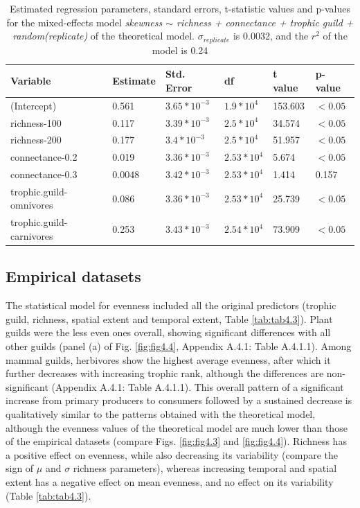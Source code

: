 \begin{landscape}
\begin{table}[ht!]
\centering
\caption[Coefficients from skewness regression in simulated networks]{\color{Gray}Estimated regression parameters, standard errors, t-statistic values and p-values for the mixed-effects model \textit{skewness $\sim$  richness + connectance + trophic guild + random(replicate)} of the theoretical model. $\sigma_{replicate}$ is 0.0032, and the $r^2$ of the model is 0.24}\label{tab:tab4.2}
\begin{tabular}{llllll}
\hline
Variable & Estimate & Std. Error &         df & t value & p-value \\
\hline
(Intercept)       & 0.561 &  $3.65*10^{-3}$ & $1.9*10^{4}$ & 153.603 & $<0.05$ \\
richness-100      & 0.117 &  $3.39*10^{-3}$ & $2.5*10^{4}$ & 34.574 & $<0.05$ \\
richness-200      & 0.177 &  $3.4*10^{-3}$ & $2.5*10^{4}$ &  51.957 & $<0.05$ \\
connectance-0.2   & 0.019 &  $3.36*10^{-3}$ & $2.53*10^{4}$ &   5.674 & $<0.05$ \\
connectance-0.3   & 0.0048 &  $3.42*10^{-3}$ & $2.53*10^{4}$ &   1.414  &  0.157  \\
trophic.guild-omnivores & 0.086 &  $3.36*10^{-3}$ & $2.53*10^{4}$ &  25.739  & $<0.05$ \\
trophic.guild-carnivores & 0.253 &  $3.43*10^{-3}$ & $2.54*10^{4}$ &  73.909  & $<0.05$ \\
\hline
\end{tabular}

\end{table}

\end{landscape}

\FloatBarrier

\subsection*{Empirical datasets}

The statistical model for evenness included all the original predictors (trophic guild, richness, spatial extent and temporal extent, Table \ref{tab:tab4.3}). Plant guilds were the less even ones overall, showing significant differences with all other guilds (panel (a) of Fig. \ref{fig:fig4.4}, Appendix A.4.1: Table A.4.1.1). Among mammal guilds, herbivores show the highest average evenness, after which it further decreases with increasing trophic rank, although the differences are non-significant (Appendix A.4.1: Table A.4.1.1). This overall pattern of a significant increase from primary producers to consumers followed by a sustained decrease is qualitatively similar to the patterns obtained with the theoretical model, although the evenness values of the theoretical model are much lower than those of the empirical datasets (compare Figs. \ref{fig:fig4.3} and \ref{fig:fig4.4}). Richness has a positive effect on evenness, while also decreasing its variability (compare the sign of $\mu$ and $\sigma$ richness parameters), whereas increasing temporal and spatial extent has a negative effect on mean evenness, and no effect on its variability (Table \ref{tab:tab4.3}).

